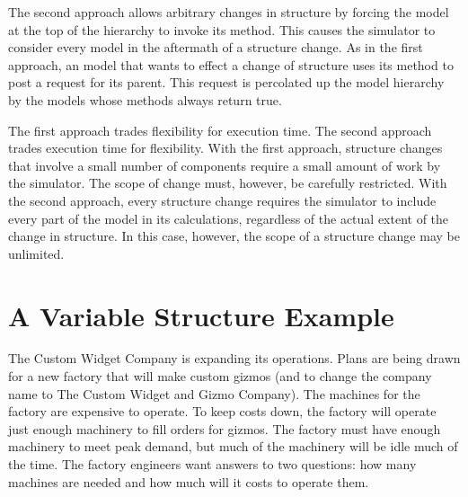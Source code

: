 The second approach allows arbitrary changes in structure by forcing the model at the top of the hierarchy to invoke its  method. This causes the simulator to consider every model in the aftermath of a structure change. As in the first approach, an  model that wants to effect a change of structure uses its  method to post a request for its parent. This request is percolated up the model hierarchy by the  models whose  methods always return true.

The first approach trades flexibility for execution time. The second approach trades execution time for flexibility. With the first approach, structure changes that involve a small number of components require a small amount of work by the simulator. The scope of change must, however, be carefully restricted. With the second approach, every structure change requires the simulator to include every part of the model in its calculations, regardless of the actual extent of the change in structure. In this case, however, the scope of a structure change may be unlimited.

\section{A Variable Structure Example}
The Custom Widget Company is expanding its operations. Plans are being drawn for a new factory that will make custom gizmos (and to change the company name to The Custom Widget and Gizmo Company). The machines for the factory are expensive to operate. To keep costs down, the factory will operate just enough machinery to fill orders for gizmos. The factory must have enough machinery to meet peak demand, but much of the machinery will be idle much of the time. The factory engineers want answers to two questions: how many machines are needed and how much will it costs to operate them.

